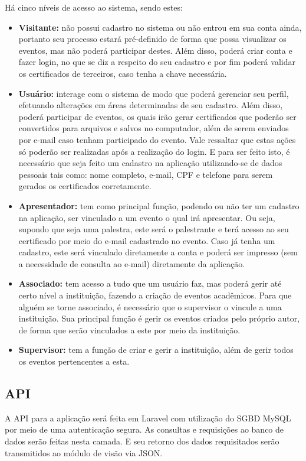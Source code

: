 Há cinco níveis de acesso ao sistema, sendo estes:
\begin{itemize}
    \item \textbf{Visitante: } não possui cadastro no sistema ou não entrou em sua conta ainda, portanto seu processo estará pré-definido de forma que possa visualizar os eventos, mas não poderá participar destes. Além disso, poderá criar conta e fazer login, no que se diz a respeito do seu cadastro e por fim poderá validar os certificados de terceiros, caso tenha a chave necessária.
    \item \textbf{Usuário: }interage com o sistema de modo que poderá gerenciar seu perfil, efetuando alterações em áreas determinadas de seu cadastro. Além disso, poderá participar de eventos, os quais irão gerar certificados que poderão ser convertidos para arquivos e salvos no computador, além de serem enviados por e-mail caso tenham participado do evento. Vale ressaltar que estas ações só poderão ser realizadas após a realização do login. E para ser feito isto, é necessário que seja feito um cadastro na aplicação utilizando-se de dados pessoais tais como: nome completo, e-mail, CPF e telefone para serem gerados os certificados corretamente. 
    \item \textbf{Apresentador: }tem como principal função, podendo ou não ter um cadastro na aplicação, ser vinculado a um evento o qual irá apresentar. Ou seja, supondo que seja uma palestra, este será o palestrante e terá acesso ao seu certificado por meio do e-mail cadastrado no evento. Caso já tenha um cadastro, este será vinculado diretamente a conta e poderá ser impresso (sem a necessidade de consulta ao e-mail) diretamente da aplicação.
    \item \textbf{Associado: }tem acesso a tudo que um usuário faz, mas poderá gerir até certo nível a instituição, fazendo a criação de eventos acadêmicos. Para que alguém se torne associado, é necessário que o supervisor o vincule a uma instituição. Sua principal função é gerir os eventos criados pelo próprio autor, de forma que serão vinculados a este por meio da instituição.
    \item \textbf{Supervisor: }tem a função de criar e gerir a instituição, além de gerir todos os eventos pertencentes a esta.
\end{itemize}


\subsection{API}
A API para a aplicação será feita em Laravel com utilização do SGBD MySQL por meio de uma autenticação segura. As consultas e requisições ao banco de dados serão feitas nesta camada. E seu retorno dos dados requisitados serão transmitidos ao módulo de visão via JSON.

